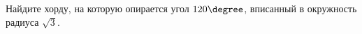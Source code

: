 \begin{ex}
	\begin{condition}
		Найдите хорду, на которую опирается угол \( 120 \degree\), вписанный в окружность радиуса \( \sqrt{3} \).
	\end{condition}
\end{ex}